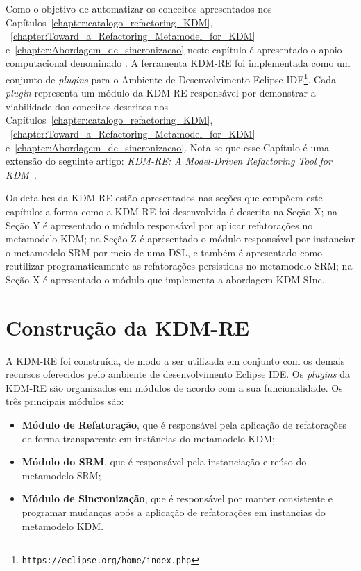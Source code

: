 Como o objetivo de automatizar os conceitos apresentados nos Capítulos~\ref{chapter:catalogo_refactoring_KDM}, ~\ref{chapter:Toward_a_Refactoring_Metamodel_for_KDM} e~\ref{chapter:Abordagem_de_sincronizacao} neste capítulo é apresentado o apoio computacional denominado . A ferramenta KDM-RE foi implementada como um conjunto de \textit{plugins} para o Ambiente de Desenvolvimento Eclipse IDE\footnote{\texttt{https://eclipse.org/home/index.php}}. Cada \textit{plugin} representa um módulo da KDM-RE responsável por demonstrar a viabilidade dos conceitos descritos nos Capítulos~\ref{chapter:catalogo_refactoring_KDM}, ~\ref{chapter:Toward_a_Refactoring_Metamodel_for_KDM} e~\ref{chapter:Abordagem_de_sincronizacao}.  Nota-se que esse Capítulo é uma extensão do seguinte artigo: \textit{KDM-RE: A Model-Driven Refactoring Tool for KDM}~\cite{durelli_VEM_ferramenta}.

Os detalhes da KDM-RE estão apresentados nas seções que compõem este capítulo: a forma como a KDM-RE foi desenvolvida é descrita na Seção X; na Seção Y é apresentado o módulo responsável por aplicar refatorações no metamodelo KDM; na Seção Z é apresentado o módulo responsável por instanciar o metamodelo SRM por meio de uma DSL, e também é apresentado como reutilizar programaticamente as refatorações persistidas no metamodelo SRM; na Seção X é apresentado o módulo que implementa a abordagem KDM-SInc.



\section{Construção da KDM-RE}\label{sec:construcao_da_kdm_re}

A KDM-RE foi construída, de modo a ser utilizada em conjunto com os demais recursos oferecidos pelo ambiente de desenvolvimento Eclipse IDE. Os \textit{plugins} da KDM-RE são organizados em módulos de acordo com a sua funcionalidade. Os três principais módulos são:

\begin{itemize}
\item \textbf{Módulo de Refatoração}, que é responsável pela aplicação de refatorações de forma transparente em instâncias do metamodelo KDM;

\item \textbf{Módulo do SRM}, que é responsável pela instanciação e reúso do metamodelo SRM;

\item \textbf{Módulo de Sincronização}, que é responsável por manter consistente e programar mudanças após a aplicação de refatorações em instancias do metamodelo KDM.

\end{itemize}

